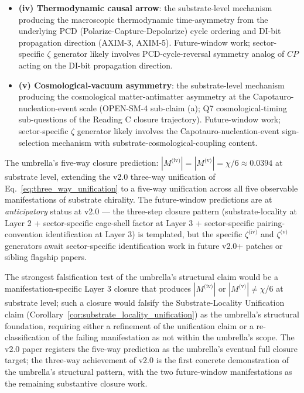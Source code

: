 \documentclass[11pt,letterpaper]{article}
\begin{document}
\begin{itemize}\setlength\itemsep{0.3em}
    \item \textbf{(iv) Thermodynamic causal arrow}: the substrate-level mechanism producing the macroscopic thermodynamic time-asymmetry from the underlying PCD (Polarize-Capture-Depolarize) cycle ordering and DI-bit propagation direction (AXIM-3, AXIM-5). Future-window work; sector-specific $\zeta$ generator likely involves PCD-cycle-reversal symmetry analog of $CP$ acting on the DI-bit propagation direction.
    \item \textbf{(v) Cosmological-vacuum asymmetry}: the substrate-level mechanism producing the cosmological matter-antimatter asymmetry at the Capotauro-nucleation-event scale (OPEN-SM-4 sub-claim (a); Q7 cosmological-timing sub-questions of the Reading C closure trajectory). Future-window work; sector-specific $\zeta$ generator likely involves the Capotauro-nucleation-event sign-selection mechanism with substrate-cosmological-coupling content.
\end{itemize}

The umbrella's five-way closure prediction: $|M^{\text{(iv)}}| = |M^{\text{(v)}}| = \chi/6 \approx 0.0394$ at substrate level, extending the v2.0 three-way unification of Eq.~\eqref{eq:three_way_unification} to a five-way unification across all five observable manifestations of substrate chirality. The future-window predictions are at \emph{anticipatory} status at v2.0 --- the three-step closure pattern (substrate-locality at Layer 2 + sector-specific cage-shell factor at Layer 3 + sector-specific pairing-convention identification at Layer 3) is templated, but the specific $\zeta^{\text{(iv)}}$ and $\zeta^{\text{(v)}}$ generators await sector-specific identification work in future v2.0+ patches or sibling flagship papers.

The strongest falsification test of the umbrella's structural claim would be a manifestation-specific Layer 3 closure that produces $|M^{\text{(iv)}}|$ or $|M^{\text{(v)}}| \neq \chi/6$ at substrate level; such a closure would falsify the Substrate-Locality Unification claim (Corollary~\ref{cor:substrate_locality_unification}) as the umbrella's structural foundation, requiring either a refinement of the unification claim or a re-classification of the failing manifestation as not within the umbrella's scope. The v2.0 paper registers the five-way prediction as the umbrella's eventual full closure target; the three-way achievement of v2.0 is the first concrete demonstration of the umbrella's structural pattern, with the two future-window manifestations as the remaining substantive closure work.
\end{document}
